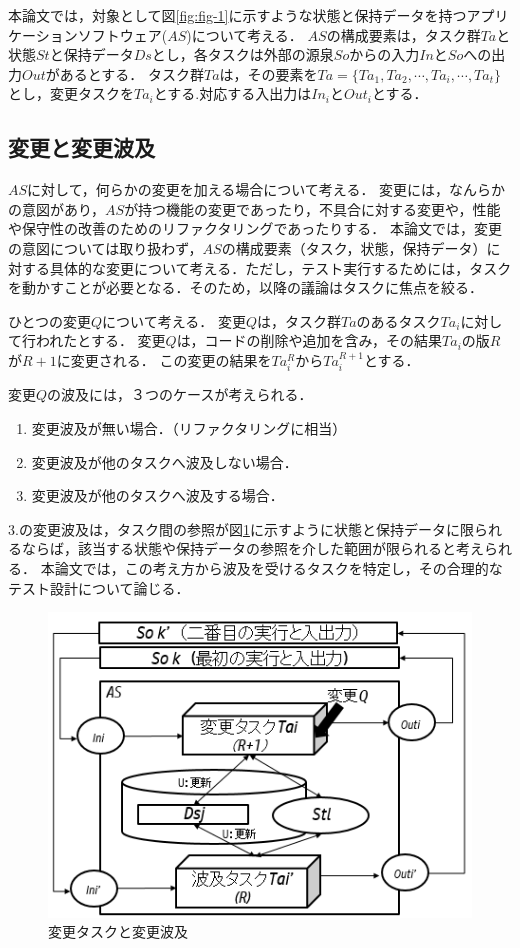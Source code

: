 \documentclass[a4paper,11pt]{jreport}
\begin{document}
本論文では，対象として図\ref{fig:fig-1}に示すような状態と保持データを持つアプリケーションソフトウェア($AS$)について考える．
$AS$の構成要素は，タスク群$Ta$と状態$St$と保持データ$Ds$とし，各タスクは外部の源泉$So$からの入力$In$と$So$への出力$Out$があるとする．
タスク群$Ta$は，その要素を$Ta=\{Ta_1,Ta_2,\cdots,Ta_i,\cdots,Ta_t \}$とし，変更タスクを$Ta_i$とする.対応する入出力は$In_i$と$Out_i$とする．

\subsection{変更と変更波及}
$AS$に対して，何らかの変更を加える場合について考える．
変更には，なんらかの意図があり，$AS$が持つ機能の変更であったり，不具合に対する変更や，性能や保守性の改善のためのリファクタリングであったりする．
本論文では，変更の意図については取り扱わず，$AS$の構成要素（タスク，状態，保持データ）に対する具体的な変更について考える．ただし，テスト実行するためには，タスクを動かすことが必要となる．そのため，以降の議論はタスクに焦点を絞る．%

ひとつの変更$Q$について考える．
変更$Q$は，タスク群$Ta$のあるタスク$Ta_i$に対して行われたとする．
変更$Q$は，コードの削除や追加を含み，その結果$Ta_i$の版$R$が$R+1$に変更される．
この変更の結果を$Ta^{R}_i$から$Ta^{R+1}_i$とする．

変更$Q$の波及には，３つのケースが考えられる．
\begin{enumerate}
  \item 変更波及が無い場合．（リファクタリングに相当）
  \item 変更波及が他のタスクへ波及しない場合．%
  \item 変更波及が他のタスクへ波及する場合．
\end{enumerate}

3.の変更波及は，タスク間の参照が図\ref{fig:fig-2}に示すように状態と保持データに限られるならば，該当する状態や保持データの参照を介した範囲が限られると考えられる．
本論文では，この考え方から波及を受けるタスクを特定し，その合理的なテスト設計について論じる．



\begin{figure}[b]
\begin{center}
\includegraphics[scale=0.5]{./image/fig-2.png}
\end{center}
\caption{変更タスクと変更波及}
\label{fig:fig-2}
\end{figure}
\end{document}
